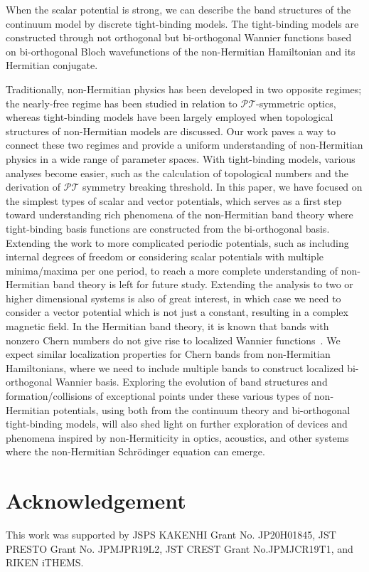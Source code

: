 \documentclass[prb,superscriptaddress,floatfix,twocolumn,showpacs]{revtex4-2}
\begin{document}
When the scalar potential is strong, we can describe the band structures of the continuum model by discrete tight-binding models. 
The tight-binding models are constructed through not orthogonal but bi-orthogonal Wannier functions based on bi-orthogonal Bloch wavefunctions of the non-Hermitian Hamiltonian and its Hermitian conjugate. 

Traditionally, non-Hermitian physics has been developed in two opposite regimes; the nearly-free regime has been studied in relation to $\mathcal{PT}$-symmetric optics, whereas tight-binding models have been largely employed when topological structures of non-Hermitian models are discussed. 
Our work paves a way to connect these two regimes and provide a uniform understanding of non-Hermitian physics in a wide range of parameter spaces. 
With tight-binding models, various analyses become easier, such as the calculation of topological numbers and the derivation of $\mathcal{PT}$ symmetry breaking threshold. 
In this paper, we have focused on the simplest types of scalar and vector potentials, which serves as a first step toward understanding rich phenomena of the non-Hermitian band theory where tight-binding basis functions are constructed from the bi-orthogonal basis. 
Extending the work to more complicated periodic potentials, such as including internal degrees of freedom or considering scalar potentials with multiple minima/maxima per one period, to reach a more complete understanding of non-Hermitian band theory is left for future study. 
Extending the analysis to two or higher dimensional systems is also of great interest, in which case we need to consider a vector potential which is not just a constant, resulting in a complex magnetic field. 
In the Hermitian band theory, it is known that bands with nonzero Chern numbers do not give rise to localized Wannier functions~\cite{brouder2007}. We expect similar localization properties for Chern bands from non-Hermitian Hamiltonians, where we need to include multiple bands to construct localized bi-orthogonal Wannier basis.
Exploring the evolution of band structures and formation/collisions of exceptional points under these various types of non-Hermitian potentials, using both from the continuum theory and bi-orthogonal tight-binding models, will also shed light on further exploration of devices and phenomena inspired by non-Hermiticity in optics, acoustics, and other systems where the non-Hermitian Schr\"odinger equation can emerge.

\section{Acknowledgement}
This work was supported by JSPS KAKENHI Grant No. JP20H01845, JST PRESTO Grant No. JPMJPR19L2, JST CREST Grant No.JPMJCR19T1, and RIKEN iTHEMS.
\end{document}
